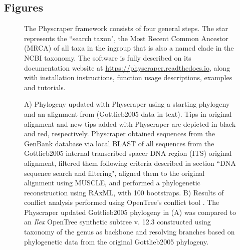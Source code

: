 \documentclass{bmcart}
\begin{document}
\begin{backmatter}
\section*{Figures}
  \begin{figure}[h!]
  \caption{The Physcraper framework consists of four general steps. The star represents
  the ``search taxon", the Most Recent Common Ancestor (MRCA) of all taxa in the
  ingroup that is also a named clade in the NCBI taxonomy. The software is fully
  described on its documentation website at \href{https://physcraper.readthedocs.io}{https://physcraper.readthedocs.io},
  along with installation instructions, function usage descriptions, examples and tutorials.
}
\end{figure}

\begin{figure}[h!]
  \caption{A) Phylogeny updated with Physcraper using a starting phylogeny and an alignment from
  \cite{gottlieb2005molecular} (Gottlieb2005 data in text).
  Tips in original alignment and new tips added with Physcraper are depicted in
  black and red, respectively. Physcraper obtained sequences from the GenBank
  database via local BLAST of all sequences from the Gottlieb2005 internal transcribed
  spacer DNA region (ITS) original alignment,
  filtered them following criteria described in section ``DNA sequence search and
  filtering", aligned them to the original alignment using MUSCLE, and performed a
  phylogenetic reconstruction using RAxML, with 100 bootstraps. B) Results of conflict
  analysis performed using OpenTree's conflict tool \cite{redelings2017supertree}.
  The Physcraper updated Gottlieb2005 phylogeny in (A) was compared to an \textit{Ilex}
  OpenTree synthetic subtree v. 12.3 \cite{ott727571} constructed using taxonomy of the genus
  as backbone and resolving branches based on phylogenetic data from the original
  Gottlieb2005 phylogeny.
}
\end{figure}


\end{backmatter}
\end{document}
